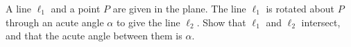 A line $\ell_1$ and a point $P$ are given in the plane. The line $\ell_1$ is rotated about $P$ through an acute angle $\alpha$ to give the line $\ell_2$. Show that $\ell_1$ and $\ell_2$ intersect, and that the acute angle between them is $\alpha$.
